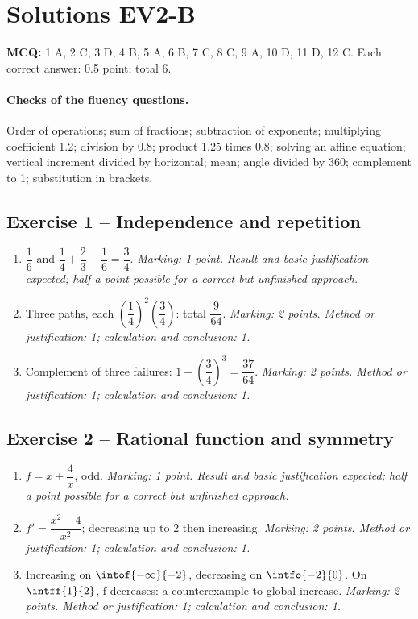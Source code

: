 \mxnewpage\section*{Solutions EV2-B}\label{EV2-B-CORR}
\textbf{MCQ:} 1 A, 2 C, 3 D, 4 B, 5 A, 6 B, 7 C, 8 C, 9 A, 10 D, 11 D, 12 C. Each correct answer: \num{0,5} point; total 6.
\paragraph{Checks of the fluency questions.} Order of operations; sum of fractions; subtraction of exponents; multiplying coefficient \num{1,2}; division by \num{0,8}; product \num{1,25} times \num{0,8}; solving an affine equation; vertical increment divided by horizontal; mean; angle divided by 360; complement to 1; substitution in brackets.
\subsection*{Exercise 1 -- Independence and repetition}
\begin{enumerate}
\item $\dfrac{1}{6}$ and $\dfrac{1}{4}+\dfrac{2}{3}-\dfrac{1}{6}=\dfrac{3}{4}$. \textit{Marking: 1 point. Result and basic justification expected; half a point possible for a correct but unfinished approach.}
\item Three paths, each $(\dfrac{1}{4})^2(\dfrac{3}{4})$: total $\dfrac{9}{64}$. \textit{Marking: 2 points. Method or justification: 1; calculation and conclusion: 1.}
\item Complement of three failures: $1-(\dfrac{3}{4})^3=\dfrac{37}{64}$. \textit{Marking: 2 points. Method or justification: 1; calculation and conclusion: 1.}
\end{enumerate}
\subsection*{Exercise 2 -- Rational function and symmetry}
\begin{enumerate}
\item $f=x+\dfrac{4}{x}$, odd. \textit{Marking: 1 point. Result and basic justification expected; half a point possible for a correct but unfinished approach.}
\item $f\prime =\dfrac{x^2-4}{x^2}$; decreasing up to 2 then increasing. \textit{Marking: 2 points. Method or justification: 1; calculation and conclusion: 1.}
\item Increasing on $\intof{-\infty}{-2}$, decreasing on $\intfo{-2}{0}$. On $\intff{1}{2}$, f decreases: a counterexample to global increase. \textit{Marking: 2 points. Method or justification: 1; calculation and conclusion: 1.}
\end{enumerate}
